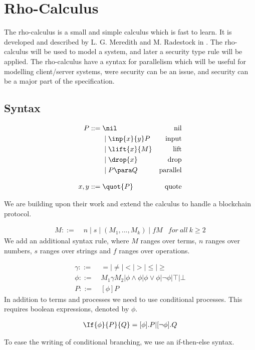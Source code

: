 \section{Rho-Calculus}
The rho-calculus is a small and simple calculus which is fast to learn.
It is developed and described by L. G. Meredith and M. Radestock in \citep{Meredith2005}.
The rho-calculus will be used to model a system, and later a security type rule will be applied.
The rho-calculus have a syntax for parallelism which will be useful for modelling client/server systems, were security can be an issue, and security can be a major part of the specification. 

\subsection{Syntax}
\begin{align*}
    P  ::= \; &  \nil & \text{nil} \\
      & \mid \inp{x}{y}P & \text{input} \\
      & \mid \lift{x}{M} & \text{lift} \\
      & \mid \drop{x} & \text{drop} \\
      & \mid P \para Q & \text{parallel} \\[3mm]
    x,y ::= \; & \quot{P} & \text{quote}\\
\end{align*}

We are building upon their work and extend the calculus to handle a blockchain protocol.

\begin{align*}
M::=\; & n \mid s \mid (M_1,...,M_k) \mid fM &for\ all\ k \geq 2
\end{align*}
We add an additional syntax rule, where $M$ ranges over terms, $n$ ranges over numbers, $s$ ranges over strings and $f$ ranges over operations.

\begin{align*}
\gamma ::=& \ =|\neq|<|>|\leq|\geq\\
\phi ::=& \ M_1\gamma M_2|\phi\land\phi|\phi\lor\phi|\neg\phi|\top|\bot\\
P::=& \ [\phi] P
\end{align*}
In addition to terms and processes we need to use conditional processes. This requires boolean expressions, denoted by \ensuremath{\phi}.

\begin{align*}
	\If{\phi}{P}{Q} = [\phi].P | [\neg \phi].Q
\end{align*}

To ease the writing of conditional branching, we use an if-then-else syntax.